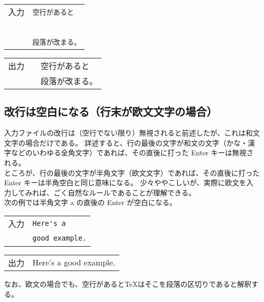 \begin{longtable}[l]{@{}c|l@{}}
  入力 & \verb'空行があると'   \\
  \    &                       \\
  \    & \verb'段落が改まる。' \\
\end{longtable}
\begin{longtable}[l]{@{}c|l@{}}
  出力 & 　空行があると        \\
  \    & 　段落が改まる。      \\
\end{longtable}
\subsection{改行は空白になる（行末が欧文文字の場合）}
入力ファイルの改行は（空行でない限り）無視されると前述したが、これは和文文字の場合だけである。
詳述すると、行の最後の文字が和文の文字（かな・漢字などのいわゆる全角文字）であれば、その直後に打った Enter キーは無視される。\\

ところが、行の最後の文字が半角文字（欧文文字）であれば、その直後に打った Enter キーは半角空白と同じ意味になる。
少々ややこしいが、実際に欧文を入力してみれば、ごく自然なルールであることが理解できる。\\

次の例では半角文字 a の直後の Enter が空白になる。
\begin{longtable}[l]{@{}c|l@{}}
  入力 & \verb`Here's a`        \\
  \    & \verb'good example.'   \\
\end{longtable}
\begin{longtable}[l]{@{}c|l@{}}
  出力 & Here's a good example. \\
\end{longtable}
なお、欧文の場合でも、空行があると\TeX{}はそこを段落の区切りであると解釈する。
